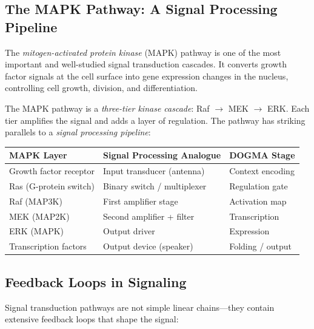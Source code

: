 \subsection{The MAPK Pathway: A Signal Processing Pipeline}

The \emph{mitogen-activated protein kinase} (MAPK) pathway is one of the most important and well-studied signal transduction cascades. It converts growth factor signals at the cell surface into gene expression changes in the nucleus, controlling cell growth, division, and differentiation.

The MAPK pathway is a \emph{three-tier kinase cascade}: Raf $\to$ MEK $\to$ ERK. Each tier amplifies the signal and adds a layer of regulation. The pathway has striking parallels to a \emph{signal processing pipeline}:

\begin{center}
\renewcommand{\arraystretch}{1.15}
\begin{tabularx}{0.95\textwidth}{L{3cm} L{4cm} Y}
\toprule
\textbf{MAPK Layer} & \textbf{Signal Processing Analogue} & \textbf{DOGMA Stage} \\
\midrule
Growth factor receptor & Input transducer (antenna) & Context encoding \\
Ras (G-protein switch) & Binary switch / multiplexer & Regulation gate \\
Raf (MAP3K) & First amplifier stage & Activation map \\
MEK (MAP2K) & Second amplifier + filter & Transcription \\
ERK (MAPK) & Output driver & Expression \\
Transcription factors & Output device (speaker) & Folding / output \\
\bottomrule
\end{tabularx}
\end{center}

\subsection{Feedback Loops in Signaling}

Signal transduction pathways are not simple linear chains---they contain extensive feedback loops that shape the signal:


